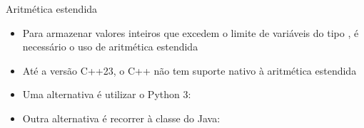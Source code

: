 \begin{frame}[fragile]{Aritmética estendida}

    \begin{itemize}
        \item Para armazenar valores inteiros que excedem o limite de variáveis do tipo
            , é necessário o uso de aritmética estendida

        \item Até a versão C++23, o C++ não tem suporte nativo à aritmética estendida

        \item Uma alternativa é utilizar o Python 3:

        \item Outra alternativa é recorrer à classe  do Java:
    \end{itemize}

\end{frame}
